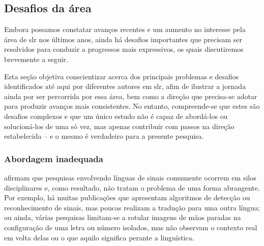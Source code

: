 \subsection{Desafios da área}
\label{sec:slr-desafios}

Embora possamos constatar avanços recentes e um aumento no interesse pela área de \acrshort{slr} nos últimos anos, ainda há desafios importantes que precisam ser resolvidos para conduzir a progressos mais expressivos, os quais discutiremos brevemente a seguir.

Esta seção objetiva conscientizar acerca dos principais problemas e desafios identificados até aqui por diferentes autores em \acrshort{slr}, afim de ilustrar a jornada ainda por ser percorrida por essa área, bem como a direção que precisa-se adotar para produzir avanços mais consistentes. No entanto, compreende-se que estes são desafios complexos e que um único estudo não é capaz de abordá-los ou solucioná-los de uma só vez, mas apenas contribuir com passos na direção estabelecida -- e o mesmo é verdadeiro para a presente pesquisa.





\subsubsection{Abordagem inadequada}
\label{sec:slr-desafios-abordagem-inadequada}

 afirmam que pesquisas envolvendo línguas de sinais comumente ocorrem em silos disciplinares e, como resultado, não tratam o problema de uma forma abrangente.
Por exemplo, há muitas publicações que apresentam algoritmos de detecção ou reconhecimento de sinais, mas poucas realizam a tradução para uma outra língua; ou ainda, várias pesquisas limitam-se a rotular imagens de mãos paradas na configuração de uma letra ou número isolados, mas não observam o contexto real em volta delas ou o que aquilo significa perante a linguística. 

